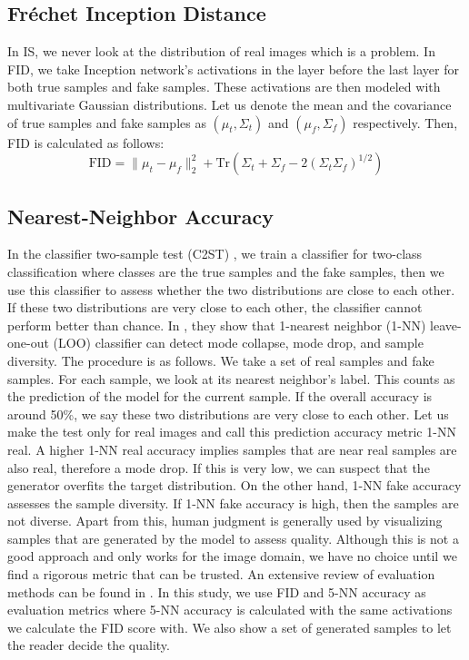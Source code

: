 \documentclass[a4paper,onesided,12pt]{report}
\begin{document}
\subsection{Fr\'echet Inception Distance}
\label{subsec:fid}
In IS, we never look at the distribution of real images which is a problem. In FID, we take Inception network's activations in the layer before the last layer for both true samples and fake samples. These activations are then modeled with multivariate Gaussian distributions. Let us denote the mean and the covariance of true samples and fake samples as $(\mu_t, \Sigma_t)$ and $(\mu_f, \Sigma_f)$ respectively. Then, FID is calculated as follows:
\begin{equation}
\label{eq:fid}
\text{FID} = \| \mu_t - \mu_f \|_2^2 + \text{Tr}(\Sigma_t + \Sigma_f - 2(\Sigma_t \Sigma_f)^{1/2})
\end{equation}

\subsection{Nearest-Neighbor Accuracy}
\label{subsec:nn}
In the classifier two-sample test (C2ST) \cite{lopez2016revisiting}, we train a classifier for two-class classification where classes are the true samples and the fake samples, then we use this classifier to assess whether the two distributions are close to each other. If these two distributions are very close to each other, the classifier cannot perform better than chance. In \cite{xu2018empirical}, they show that 1-nearest neighbor (1-NN) leave-one-out (LOO) classifier can detect mode collapse, mode drop, and sample diversity. The procedure is as follows. We take a set of real samples and fake samples. For each sample, we look at its nearest neighbor's label. This counts as the prediction of the model for the current sample. If the overall accuracy is around 50\%, we say these two distributions are very close to each other. Let us make the test only for real images and call this prediction accuracy metric 1-NN real. A higher 1-NN real accuracy implies samples that are near real samples are also real, therefore a mode drop. If this is very low, we can suspect that the generator overfits the target distribution. On the other hand, 1-NN fake accuracy assesses the sample diversity. If 1-NN fake accuracy is high, then the samples are not diverse. 
Apart from this, human judgment is generally used by visualizing samples that are generated by the model to assess quality. Although this is not a good approach and only works for the image domain, we have no choice until we find a rigorous metric that can be trusted. An extensive review of evaluation methods can be found in \cite{borji2019pros}. In this study, we use FID and 5-NN accuracy as evaluation metrics where 5-NN accuracy is calculated with the same activations we calculate the FID score with. We also show a set of generated samples to let the reader decide the quality.
\end{document}
